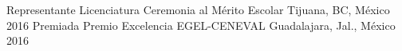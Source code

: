 \vspace{-5mm}
\begin{cvhonors}
  \cvhonor
    {Representante Licenciatura}
    {Ceremonia al Mérito Escolar}
    {Tijuana, BC, México}
    {2016}
  \cvhonor
    {Premiada}
    {Premio Excelencia EGEL-CENEVAL}
    {Guadalajara, Jal., México}
    {2016}
\end{cvhonors}
